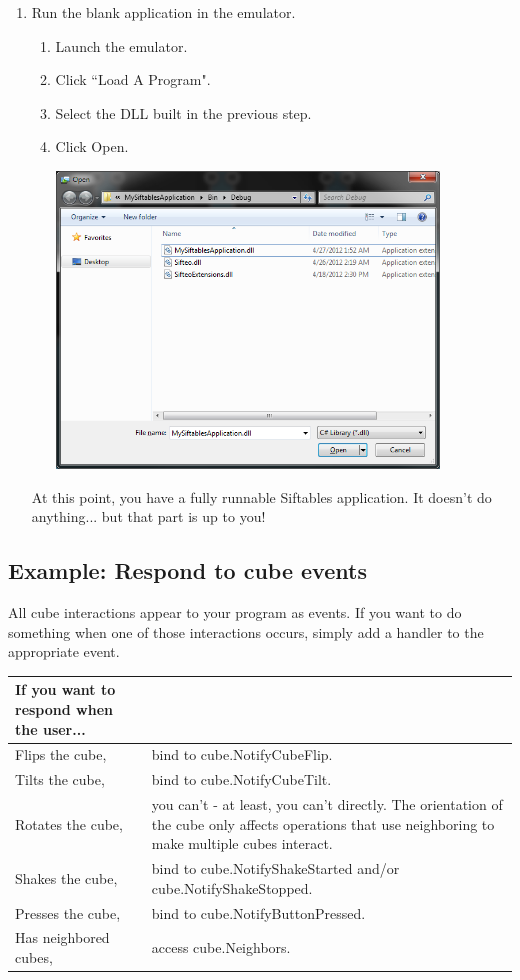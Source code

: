 \documentclass[12pt]{article}
\begin{document}
\begin{enumerate}
\item Run the blank application in the emulator.
\begin{enumerate}
\item Launch the emulator.
\item Click ``Load A Program".
\item Select the DLL built in the previous step.
\item Click Open.
\begin{center}\includegraphics[width=4in]{3-1Open}\end{center}
\end{enumerate}
At this point, you have a fully runnable Siftables application. It doesn't do anything... but that part is up to you!\\

\end{enumerate}

\subsection{Example: Respond to cube events}
All cube interactions appear to your program as events. If you want to do something when one of those interactions occurs, simply add a handler to the appropriate event.

	\begin{tabular}{ | p{2in} | p{4in} | }
	\hline
	\textbf{If you want to respond when the user...} &  \\\hline
	Flips the cube,  & bind to cube.NotifyCubeFlip. \\\hline
	Tilts the cube, & bind to cube.NotifyCubeTilt. \\\hline
	Rotates the cube, & you can't - at least, you can't directly. The orientation of the cube only affects operations that use neighboring to make multiple cubes interact. \\\hline
	Shakes the cube, & bind to cube.NotifyShakeStarted and/or cube.NotifyShakeStopped. \\\hline
	Presses the cube, & bind to cube.NotifyButtonPressed. \\\hline
	Has neighbored cubes, & access cube.Neighbors. \\\hline
	\end{tabular}\\
	
\end{document}
